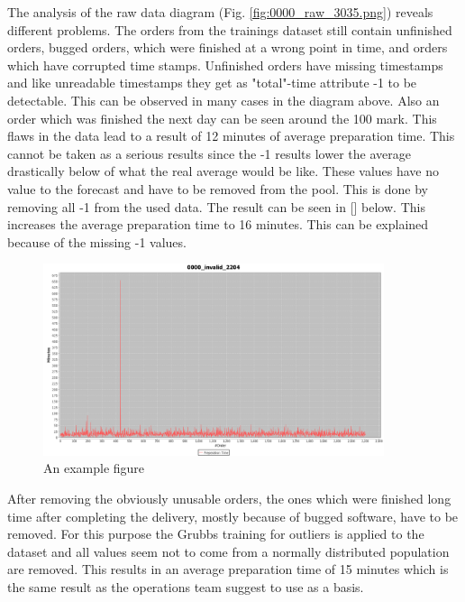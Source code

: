 The analysis of the raw data diagram (Fig. \ref{fig:0000_raw_3035.png}) reveals different problems. The orders from the trainings dataset still contain unfinished orders, bugged orders, which were finished at a wrong point in time, and orders which have corrupted time stamps. Unfinished orders have missing timestamps and like unreadable timestamps they get as "total"-time attribute -1 to be detectable. This can be observed in many cases in the diagram above. Also an order which was finished the next day can be seen around the 100 mark. This flaws in the data lead to a result of 12 minutes of average preparation time. This cannot be taken as a serious results since the -1 results lower the average drastically below of what the real average would be like. These values have no value to the forecast and have to be removed from the pool. This is done by removing all -1 from the used data. The result can be seen in [] below. This increases the average preparation time to 16 minutes. This can be explained because of the missing -1 values.

\begin{figure}[h]
\begin{center}
\includegraphics[width=10cm]{images/0000_invalid_2204.png}
\caption{An example figure}
\label{fig:example}
\end{center}
\end{figure}

After removing the obviously unusable orders, the ones which were finished long time after completing the delivery, mostly because of bugged software, have to be removed. For this purpose the Grubbs training for outliers is applied to the dataset and all values seem not to come from a normally distributed population are removed. This results in an average preparation time of 15 minutes which is the same result as the operations team suggest to use as a basis.

